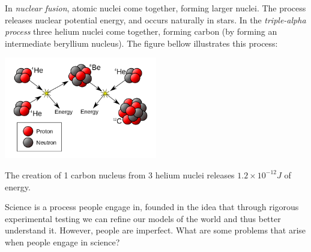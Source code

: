 \documentclass[addpoints,12pt]{exam}
\begin{document}
\begin{questions}

\clearpage

\bonusquestion In \textit{nuclear fusion}, atomic nuclei come together, forming larger nuclei. The process releases nuclear potential energy, and occurs naturally in stars. In the \textit{triple-alpha process} three helium nuclei come together, forming carbon (by forming an intermediate beryllium nucleus). The figure bellow illustrates this process:

\begin{center}
\includegraphics[width=0.5\textwidth]{../images/Triple-Alpha_Process.png}
\end{center}

The creation of 1 carbon nucleus from 3 helium nuclei releases $1.2\times 10^{-12}J$ of energy.


\clearpage
\bonusquestion[4] Science is a process people engage in, founded in the idea that through rigorous experimental testing we can refine our models of the world and thus better understand it. However, people are imperfect. What are some problems that arise when people engage in science?
\fillwithlines{4in}

\end{questions}
\end{document}
